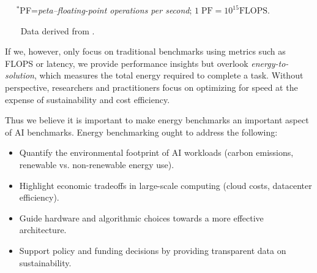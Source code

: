\begin{table}[tb]

    \caption{Evolution of the leadership class supercomputer at Oak Ridge National Laboratory}
    \label{tab:ornl-energy}
    

    \smallskip
    {\tiny~~ $^*$PF=\emph{peta–floating-point operations per second}; $1\;\text{PF}=10^{15}\text{FLOPS}.$

    ~~~ Data derived from \cite{papatheodore2022summitfrontier}.
    }
\end{table}

If we, however, only focus on traditional benchmarks using metrics such as FLOPS or latency, we provide performance insights but overlook {\em energy-to-solution}, which measures the total energy required to complete a task. Without perspective, researchers and practitioners focus on optimizing for speed at the expense of sustainability and cost efficiency. 

Thus we believe it is important to make energy benchmarks an important aspect of AI benchmarks. Energy benchmarking ought to address the following:

\begin{itemize}
     \item Quantify the environmental footprint of AI workloads (carbon emissions, renewable vs. non-renewable energy use).
     \item Highlight economic tradeoffs in large-scale computing (cloud costs, datacenter efficiency). 
     \item Guide hardware and algorithmic choices towards a more effective architecture.
     \item Support policy and funding decisions by providing transparent data on sustainability. 
 \end{itemize}

